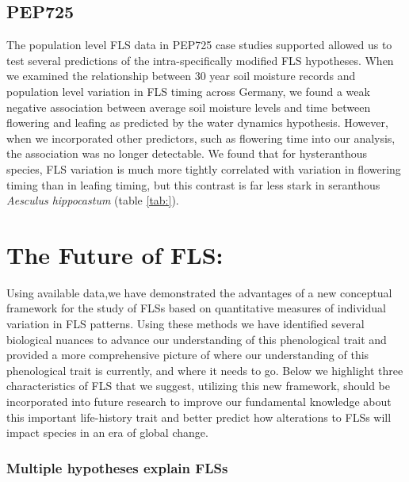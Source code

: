 \documentclass{article}
\begin{document}
\subsection{PEP725}
The population level FLS data in PEP725 case studies supported allowed us to test several predictions of the intra-specifically modified FLS hypotheses. When we examined the relationship between 30 year soil moisture records \citep{DWD} and population level variation in FLS timing across Germany, we found a weak negative association between average soil moisture levels and time between flowering and leafing as predicted by the water dynamics hypothesis. However, when we incorporated other predictors, such as flowering time into our analysis, the association was no longer detectable. We found that for hysteranthous species, FLS variation is much more tightly correlated with variation in flowering timing than in leafing timing, but this contrast is far less stark in seranthous \textit{Aesculus hippocastum} (table \ref{tab:}). 

\section*{The Future of FLS:}
Using available data,we have demonstrated the advantages of a new conceptual framework for the study of FLSs based on quantitative measures of individual variation in FLS patterns. Using these methods we have identified several biological nuances to advance our understanding of this phenological trait and provided a more comprehensive picture of where our understanding of this phenological trait is currently, and where it needs to go. Below we highlight three characteristics of FLS that we suggest, utilizing this new framework, should be incorporated into future research to improve our fundamental knowledge about this important life-history trait and better predict how alterations to FLSs will impact species in an era of global change.

\subsubsection*{Multiple hypotheses explain FLSs}
\end{document}
